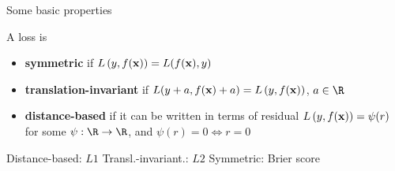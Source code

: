 \documentclass[11pt,compress,t,notes=noshow, xcolor=table]{beamer}
\begin{document}
\begin{frame}{Some basic properties}

A loss is  
\begin{itemize}
  \item \textbf{symmetric} if $L\left(y, f(\mathbf{x})\right) = L(f(\mathbf{x}), y)$
  \item \textbf{translation-invariant} if $L(y + a, f(\mathbf{x}) + a) = L\left(y, f(\mathbf{x})\right)$, 
  $a \in \R$
  \item \textbf{distance-based} if it can be written in terms of residual 
    $L\left(y, f(\mathbf{x})\right) = \psi (r)$ for some $\psi: \R \to \R$, and 
    $\psi(r) = 0 \Leftrightarrow r = 0$
 \end{itemize}


\vfill

\splitVThree
{
  \small \centering
  Distance-based: $L1$
}%
{
  \small \centering
  Transl.-invariant.: $L2$
}%
{
  \small \centering
  Symmetric: Brier score
}

\end{frame}

\end{document}
